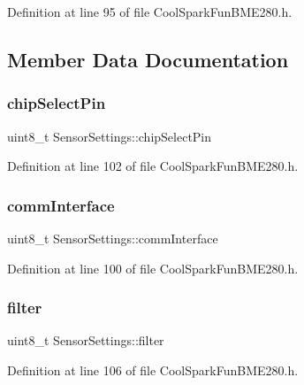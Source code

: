 Definition at line 95 of file Cool\+Spark\+Fun\+B\+M\+E280.\+h.



\subsection{Member Data Documentation}
\mbox{\label{struct_sensor_settings_abe2de606ebb580ad81e3fafb1a454580}} 
\subsubsection{\texorpdfstring{chip\+Select\+Pin}{chipSelectPin}}
{\footnotesize\ttfamily uint8\+\_\+t Sensor\+Settings\+::chip\+Select\+Pin}



Definition at line 102 of file Cool\+Spark\+Fun\+B\+M\+E280.\+h.

\mbox{\label{struct_sensor_settings_a5bf116387c543a6ea5732976424e8cb1}} 
\subsubsection{\texorpdfstring{comm\+Interface}{commInterface}}
{\footnotesize\ttfamily uint8\+\_\+t Sensor\+Settings\+::comm\+Interface}



Definition at line 100 of file Cool\+Spark\+Fun\+B\+M\+E280.\+h.

\mbox{\label{struct_sensor_settings_a69dc95368069a0f408a141d4c2cbf045}} 
\subsubsection{\texorpdfstring{filter}{filter}}
{\footnotesize\ttfamily uint8\+\_\+t Sensor\+Settings\+::filter}



Definition at line 106 of file Cool\+Spark\+Fun\+B\+M\+E280.\+h.

